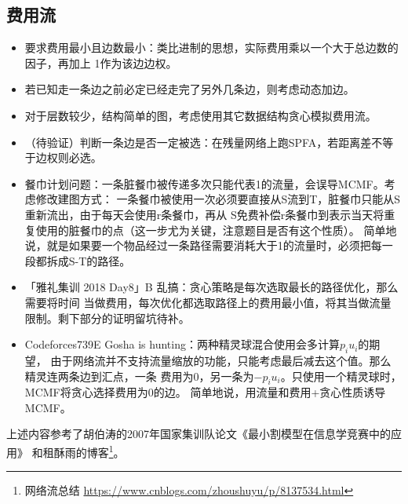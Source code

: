 \subsection{费用流}
\begin{itemize}
    \item 要求费用最小且边数最小：类比进制的思想，实际费用乘以一个大于总边数的因子，再加上
    1作为该边边权。
    \item 若已知走一条边之前必定已经走完了另外几条边，则考虑动态加边。
    \item 对于层数较少，结构简单的图，考虑使用其它数据结构贪心模拟费用流。
    \item （待验证）判断一条边是否一定被选：在残量网络上跑SPFA，若距离差不等于边权则必选。
    \item 餐巾计划问题：一条脏餐巾被传递多次只能代表1的流量，会误导MCMF。考虑修改建图方式：
    一条餐巾被使用一次必须要直接从S流到T，脏餐巾只能从S重新流出，由于每天会使用r条餐巾，再从
    S免费补偿r条餐巾到表示当天将重复使用的脏餐巾的点（这一步尤为关键，注意题目是否有这个性质）。
    简单地说，就是如果要一个物品经过一条路径需要消耗大于1的流量时，必须把每一段都拆成S-T的路径。

    \item 「雅礼集训 2018 Day8」B 乱搞：贪心策略是每次选取最长的路径优化，那么需要将时间
    当做费用，每次优化都选取路径上的费用最小值，将其当做流量限制。剩下部分的证明留坑待补。
    \item Codeforces739E Gosha is hunting：两种精灵球混合使用会多计算$p_iu_i$的期望，
    由于网络流并不支持流量缩放的功能，只能考虑最后减去这个值。那么精灵连两条边到汇点，一条
    费用为0，另一条为$-p_iu_i$。只使用一个精灵球时，MCMF将贪心选择费用为0的边。
    简单地说，用流量和费用+贪心性质诱导MCMF。
\end{itemize}

上述内容参考了胡伯涛的2007年国家集训队论文《最小割模型在信息学竞赛中的应用》
\cite{MCIOI}和租酥雨的博客\footnote{
    网络流总结
    \url{https://www.cnblogs.com/zhoushuyu/p/8137534.html}
}。
